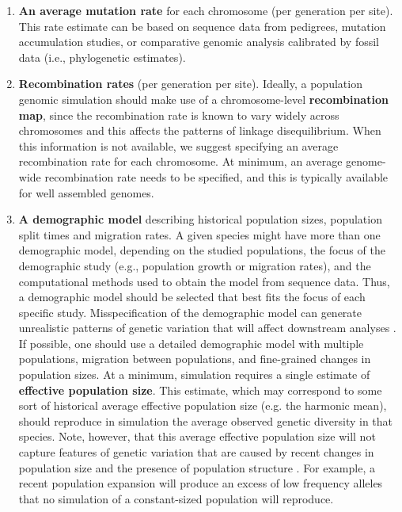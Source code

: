 \documentclass[hidelinks]{article}
\begin{document}
\begin{enumerate}
\item
  \textbf{An average mutation rate} for each chromosome (per generation per site).
  This rate estimate can be based on sequence data from pedigrees, mutation accumulation studies, 
  or comparative genomic analysis calibrated by fossil data (i.e., phylogenetic estimates).

\item
  \textbf{Recombination rates} (per generation per site).
  Ideally, a population genomic simulation should make use of a chromosome-level \textbf{recombination map}, since the recombination rate is known to vary widely across chromosomes and this affects the patterns of linkage disequilibrium. When this information is not available, we suggest specifying an average recombination rate for each chromosome.
  At minimum, an average genome-wide recombination rate needs to be specified, and this is typically available for well assembled genomes.

\item
  \textbf{A demographic model} describing historical population sizes, population split times and migration rates. A given species might have more than one demographic model, depending on the studied populations, the focus of the demographic study (e.g., population growth or migration rates), and the computational methods used to obtain the model from sequence data. Thus, a demographic model should be selected that best fits the focus of each specific study. Misspecification of the demographic model can generate unrealistic patterns of genetic variation that will affect downstream analyses \citep[e.g.,][]{Navascues2009}. If possible, one should use a detailed demographic model with multiple populations, migration between populations, and fine-grained changes in population sizes. At a minimum, simulation requires a single estimate of \textbf{effective population size}. This estimate, which may correspond to some sort of historical average effective population size (e.g. the harmonic mean), should reproduce in simulation the average observed genetic diversity in that species. Note, however, that this average effective population size will not capture features of genetic variation that are caused by recent changes in population size and the presence of population structure \citep{MacLeod2013}. For example, a recent population expansion will produce
  an excess of low frequency alleles that no simulation of a constant-sized
  population will reproduce.


\end{enumerate}
\end{document}
